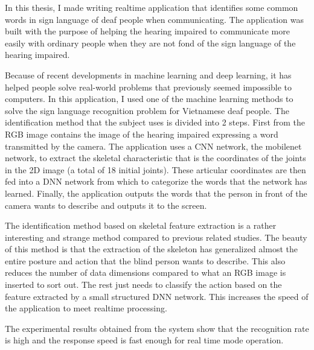 \newpage
\thispagestyle{abstract}
\begin{center}
{}
\end{center}
In this thesis, I made writing realtime application that identifies some common words in sign language of deaf people when communicating. The application was built with the purpose of helping the hearing impaired to communicate more easily with ordinary people when they are not fond of the sign language of the hearing impaired.

Because of recent developments in machine learning and deep learning, it has helped people solve real-world problems that previously seemed impossible to computers. In this application, I used one of the machine learning methods to solve the sign language recognition problem for Vietnamese deaf people. The identification method that the subject uses is divided into 2 steps. First from the RGB image contains the image of the hearing impaired expressing a word transmitted by the camera. The application uses a CNN network, the mobilenet network, to extract the skeletal characteristic that is the coordinates of the joints in the 2D image (a total of 18 initial joints). These articular coordinates are then fed into a DNN network from which to categorize the words that the network has learned. Finally, the application outputs the words that the person in front of the camera wants to describe and outputs it to the screen.

The identification method based on skeletal feature extraction is a rather interesting and strange method compared to previous related studies. The beauty of this method is that the extraction of the skeleton has generalized almost the entire posture and action that the blind person wants to describe. This also reduces the number of data dimensions compared to what an RGB image is inserted to sort out. The rest just needs to classify the action based on the feature extracted by a small structured DNN network. This increases the speed of the application to meet realtime processing.

The experimental results obtained from the system show that the recognition rate is high and the response speed is fast enough for real time mode operation.

\newpage
{}
{\fontsize{12pt}{5pt}\selectfont
\tableofcontents}


